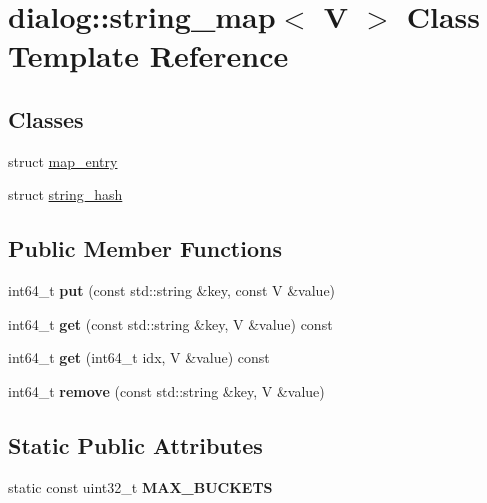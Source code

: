 \hypertarget{classdialog_1_1string__map}{}\section{dialog\+:\+:string\+\_\+map$<$ V $>$ Class Template Reference}
\label{classdialog_1_1string__map}
\subsection*{Classes}
\begin{DoxyCompactItemize}
\item 
struct \hyperlink{structdialog_1_1string__map_1_1map__entry}{map\+\_\+entry}
\item 
struct \hyperlink{structdialog_1_1string__map_1_1string__hash}{string\+\_\+hash}
\end{DoxyCompactItemize}
\subsection*{Public Member Functions}
\begin{DoxyCompactItemize}
\item 
\mbox{\label{classdialog_1_1string__map_a1cc7d8c33334155940ed24d35cb89179}} 
int64\+\_\+t {\bfseries put} (const std\+::string \&key, const V \&value)
\item 
\mbox{\label{classdialog_1_1string__map_a2632213e9330871062cb565bfdf13f21}} 
int64\+\_\+t {\bfseries get} (const std\+::string \&key, V \&value) const
\item 
\mbox{\label{classdialog_1_1string__map_aeba4544f65c810f4232c1a690461401a}} 
int64\+\_\+t {\bfseries get} (int64\+\_\+t idx, V \&value) const
\item 
\mbox{\label{classdialog_1_1string__map_a455e9d6004cd0dbb9a35e15f025b0893}} 
int64\+\_\+t {\bfseries remove} (const std\+::string \&key, V \&value)
\end{DoxyCompactItemize}
\subsection*{Static Public Attributes}
\begin{DoxyCompactItemize}
\item 
static const uint32\+\_\+t {\bfseries M\+A\+X\+\_\+\+B\+U\+C\+K\+E\+TS}
\end{DoxyCompactItemize}



